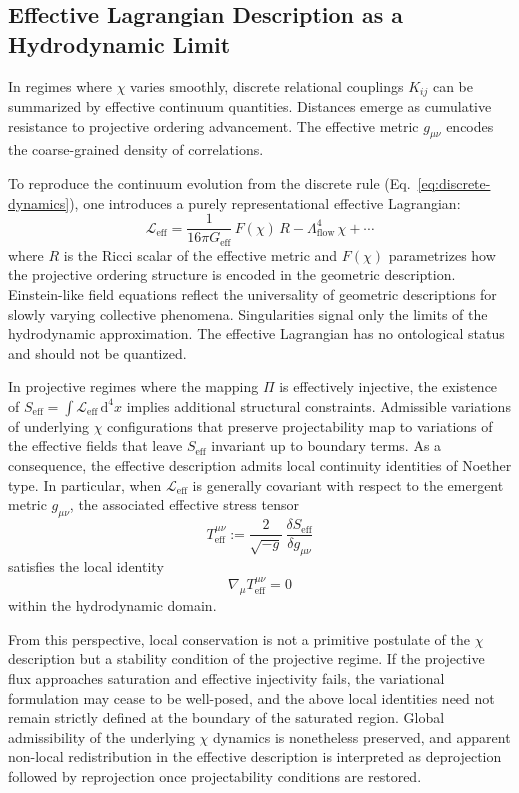 \subsection{Effective Lagrangian Description as a Hydrodynamic Limit}
  \label{subsec:hydrodynamic-limit}

  In regimes where $\chi$ varies smoothly, discrete relational couplings
  $K_{ij}$ can be summarized by effective continuum quantities.
  Distances emerge as cumulative resistance to projective ordering advancement.
  The effective metric $g_{\mu\nu}$ encodes the coarse-grained density of correlations.

  To reproduce the continuum evolution from the discrete rule
  (Eq.~\ref{eq:discrete-dynamics}), one introduces a purely
  representational effective Lagrangian:
  \[
    \mathcal{L}_{\text{eff}}
    = \frac{1}{16\pi G_{\text{eff}}}\,F(\chi)\,R
    - \Lambda_{\text{flow}}^4\,\chi + \cdots
  \]
  where $R$ is the Ricci scalar of the effective metric and $F(\chi)$
  parametrizes how the projective ordering structure is encoded in the
  geometric description.
  Einstein-like field equations reflect the universality of geometric
  descriptions for slowly varying collective phenomena.
  Singularities signal only the limits of the hydrodynamic approximation.
  The effective Lagrangian has no ontological status and should not be quantized.

  In projective regimes where the mapping $\Pi$ is effectively injective,
  the existence of $S_{\text{eff}}=\int \mathcal{L}_{\text{eff}}\,\mathrm{d}^4x$
  implies additional structural constraints.
  Admissible variations of underlying $\chi$ configurations that preserve
  projectability map to variations of the effective fields that leave
  $S_{\text{eff}}$ invariant up to boundary terms.
  As a consequence, the effective description admits local continuity identities of Noether type.
  In particular, when $\mathcal{L}_{\text{eff}}$ is generally covariant
  with respect to the emergent metric $g_{\mu\nu}$, the associated effective stress tensor
  \[
    T^{\mu\nu}_{\text{eff}}
    := \frac{2}{\sqrt{-g}}\,
    \frac{\delta S_{\text{eff}}}{\delta g_{\mu\nu}}
  \]
  satisfies the local identity
  \[
    \nabla_\mu T^{\mu\nu}_{\text{eff}} = 0
  \]
  within the hydrodynamic domain.

  From this perspective, local conservation is not a primitive postulate
  of the $\chi$ description but a stability condition of the projective regime.
  If the projective flux approaches saturation and effective injectivity fails,
  the variational formulation may cease to be well-posed,
  and the above local identities need not remain strictly defined
  at the boundary of the saturated region.
  Global admissibility of the underlying $\chi$ dynamics is nonetheless preserved,
  and apparent non-local redistribution in the effective description
  is interpreted as deprojection followed by reprojection
  once projectability conditions are restored.
